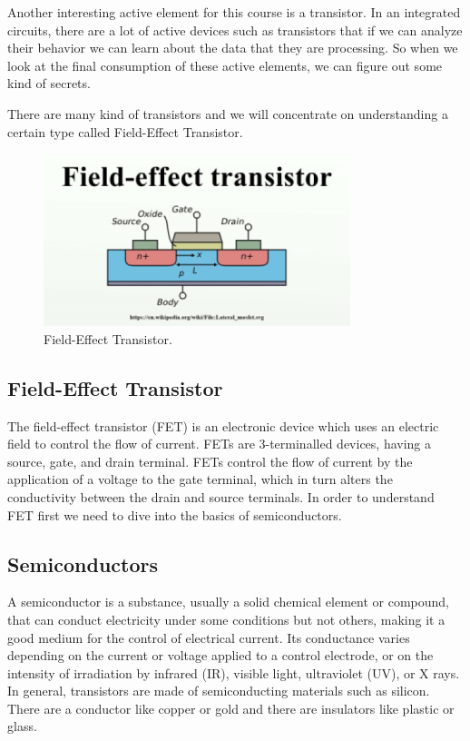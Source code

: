 Another interesting active element for this course is a transistor. In an integrated circuits, there are a lot of active devices such as transistors  that if we can analyze their behavior we can learn about the data that they are processing. So when we look at the final consumption of these active elements, we can figure out some kind of secrets.

There are many kind of transistors and we will concentrate on understanding a certain type called Field-Effect Transistor.

\begin{figure}[!ht]
	\centering
	\includegraphics{images/field_effect_transistor.png}
	\caption{Field-Effect Transistor.} \label{fig:field_effect_transistor}
\end{figure}

\subsection{Field-Effect Transistor}

The field-effect transistor (FET) is an electronic device which uses an electric field to control the flow of current. FETs are 3-terminalled devices, having a source, gate, and drain terminal. FETs control the flow of current by the application of a voltage to the gate terminal, which in turn alters the conductivity between the drain and source terminals. In order to understand FET first we need to dive into the basics of semiconductors.

\subsection{Semiconductors}

A semiconductor is a substance, usually a solid chemical element or compound, that can conduct electricity under some conditions but not others, making it a good medium for the control of electrical current. Its conductance varies depending on the current or voltage applied to a control electrode, or on the intensity of irradiation by infrared (IR), visible light, ultraviolet (UV), or X rays. In general, transistors are made of semiconducting materials such as silicon. There are a conductor like copper or gold and there are insulators like plastic or glass.

